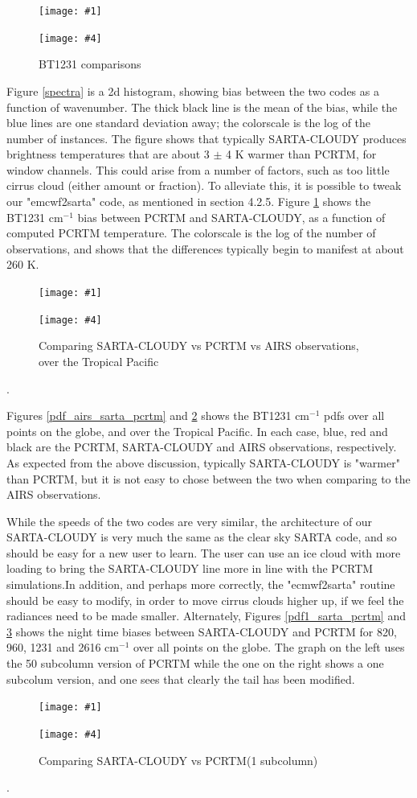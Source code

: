 \documentclass[11pt]{article}
\newcommand{\sa}{\textsf{SARTA}\xspace}
\newcommand{\sasc}{\textsf{SARTA-CLOUDY}\xspace}
\newcommand{\pcrtm}{\textsf{PCRTM}\xspace}
\newcommand{\dfigure}[6]
{
\begin{figure}
  \begin{minipage}[t]{0.45\textwidth}
  \centering
  \texttt{[image: \#1]}
   \caption{#2}  \label{#3}
  \end{minipage}
  \hfil
  \begin{minipage}[t]{0.45\linewidth}
  \centering
  \texttt{[image: \#4]}
   \caption{#5}  \label{#6}
  \end{minipage}
\end{figure}
}
\newcommand{\wn}{cm$^{-1}$\xspace}
\begin{document}
\dfigure{Figs/spectra_sartaVSpcrtm.jpg}{Comparing \sasc vs \pcrtm}{spectra}{Figs/pcrtm_calc_vs_sarta_biasV1}{BT1231 comparisons}{bt1231_sarta_pcrtm}

Figure \ref{spectra} is a 2d histogram, showing bias between the two codes as a function of wavenumber. The thick 
black line is the mean of the bias, while the blue lines are one standard deviation away; the colorscale is the 
log of the number of instances. The figure shows that typically \sasc produces brightness temperatures that are about 
3 $\pm$ 4 K warmer than \pcrtm, for window channels. This could arise from a number of factors, such as too 
little cirrus cloud (either amount or fraction). To alleviate this, it is possible to tweak our 
"emcwf2sarta" code, as mentioned in section 4.2.5. Figure \ref{bt1231_sarta_pcrtm} shows the BT1231 \wn bias between
\pcrtm and \sasc, as a function of computed \pcrtm temperature. The colorscale is the log of the number of
observations, and shows that the differences typically begin to manifest at about 260 K.

\dfigure{Figs/pcrtm_vs_sarta_vs_obs_pdf1231_allregions.jpg}{Comparing \sasc vs \pcrtm vs AIRS observations, over all the globe}{pdf_airs_sarta_pcrtm}{Figs/pcrtm_vs_sarta_vs_obs_pdf1231_pacific.jpg}{Comparing \sasc vs \pcrtm vs AIRS observations, over the Tropical Pacific}{pdf_airs_sarta_pcrtm_tropical_pacific}. 

Figures \ref{pdf_airs_sarta_pcrtm} and \ref{pdf_airs_sarta_pcrtm_tropical_pacific} shows 
the BT1231 \wn pdfs over all points on the globe, and over the Tropical Pacific. In each case, blue, red 
and black are the \pcrtm, \sasc and AIRS observations, respectively. As expected from the above discussion,
typically \sasc is "warmer" than \pcrtm, but it is not easy to chose between the two when comparing to the 
AIRS observations.

While the speeds of the two codes are very similar, the architecture of our \sasc is very much the same as 
the clear sky \sa code, and so should be easy for a new user to learn. The user can use an ice cloud with 
more loading to bring the \sasc line more in line with the \pcrtm simulations.In addition, and perhaps
more correctly, the "ecmwf2sarta" routine should be easy to modify, in order to move cirrus clouds higher 
up, if we feel the radiances need to be made smaller. Alternately, Figures \ref{pdf1_sarta_pcrtm} and 
\ref{pdf2_sarta_pcrtm} shows the night time biases between \sasc and \pcrtm for 820, 960, 1231 and 2616 \wn
over all points on the globe. The graph on the left uses the 50 subcolumn version of \pcrtm while the one on the right 
shows a one subcolum version, and one sees that clearly the tail has been modified.

\dfigure{Figs/pcrtm_calc_vs_sarta_calc_histV1.jpg}{Comparing \sasc vs \pcrtm (50 subcolumns)}{pdf1_sarta_pcrtm}{Figs/pcrtm_calc_vs_sarta_calc_histV2.jpg}{Comparing \sasc vs \pcrtm (1 subcolumn)}{pdf2_sarta_pcrtm}. 



\end{document}
